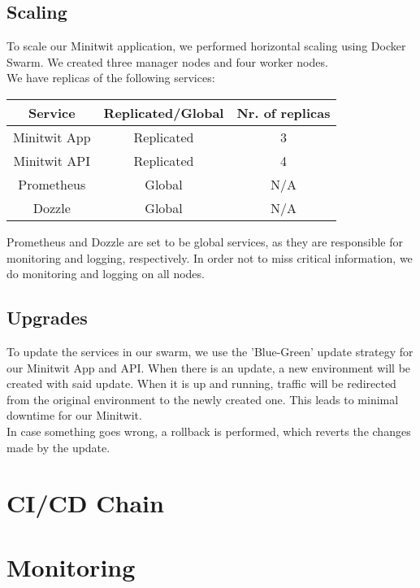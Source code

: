 \subsection{Scaling}
To scale our Minitwit application, we performed horizontal scaling using Docker Swarm. We created three manager nodes and four worker nodes. \\
We have replicas of the following services:
\begin{center}
\begin{tabular}{ |c|c|c| } 
 \hline
 Service & Replicated/Global & Nr. of replicas \\ 
 \hline
 Minitwit App & Replicated & 3 \\ 
 \hline
 Minitwit API & Replicated & 4 \\
 \hline
 Prometheus & Global & N/A \\ 
 \hline
 Dozzle & Global & N/A \\ 
 \hline
\end{tabular}
\end{center}

Prometheus and Dozzle are set to be global services, as they are responsible for monitoring and logging, respectively. In order not to miss critical information, we do monitoring and logging on all nodes.

\subsection{Upgrades}
To update the services in our swarm, we use the 'Blue-Green' update strategy for our Minitwit App and API. When there is an update, a new environment will be created with said update. When it is up and running, traffic will be redirected from the original environment to the newly created one. This leads to minimal downtime for our Minitwit.\\
In case something goes wrong, a rollback is performed, which reverts the changes made by the update.

\section{CI/CD Chain}


\section{Monitoring}
